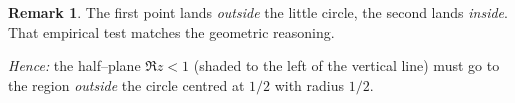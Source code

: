 \documentclass[12pt]{article}
\theoremstyle{definition} %
\newtheorem{remark}{Remark}
\theoremstyle{plain} %
\begin{document}
\begin{remark}
         The first point lands \emph{outside} the little circle, the second
         lands \emph{inside}.  
         That empirical test matches the geometric reasoning.
         
         \medskip
         \noindent
         \emph{Hence:} the half–plane \(\Re z<1\) (shaded to the left of the
         vertical line) must go to the region \emph{outside} the circle centred
         at \(1/2\) with radius \(1/2\).
         \end{remark}
\end{document}
